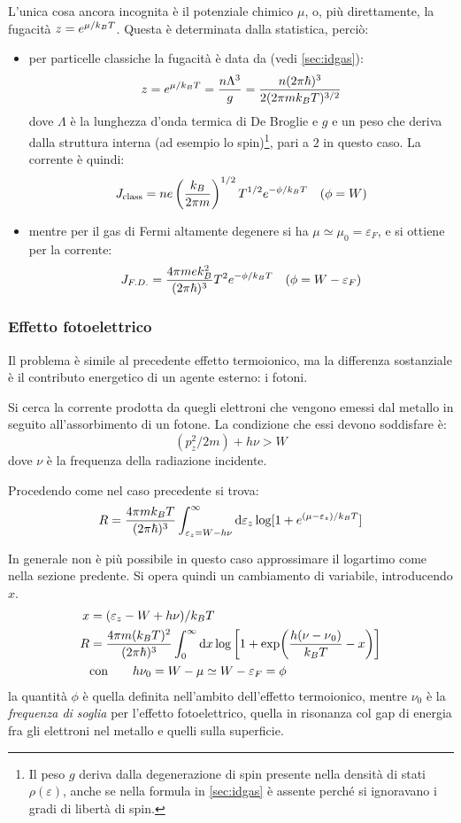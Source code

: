 L'unica cosa ancora incognita è il potenziale chimico $ \mu $, o, più direttamente, la fugacità $ z = e^{\mu/k_B T} $. Questa è determinata dalla statistica, perciò:
\begin{itemize}
	\item per particelle classiche la fugacità è data da (vedi \cref{sec:idgas}):
	\[ z = e^{\mu/k_B T} = \frac{n \Lambda^3}{g} = \frac{n (2\pi \hbar)^3}{2(2\pi m k_B T)^{3/2}} \]
	dove $ \Lambda $ è la lunghezza d'onda termica di De Broglie e $ g $ e un peso che deriva dalla struttura interna (ad esempio lo spin)\footnote{Il peso $ g $ deriva dalla degenerazione di spin presente nella densità di stati $ \rho(\varepsilon) $, anche se nella formula in \cref{sec:idgas} è assente perché si ignoravano i gradi di libertà di spin.}, pari a $ 2 $ in questo caso. La corrente è quindi:
	\[  J_{\text{class}} = ne \left(\frac{k_B}{2\pi m}\right)^{1/2} T^{1/2} e^{-\phi/k_B T} \quad (\phi = W)\]
	\item mentre 
	per il gas di Fermi altamente degenere si ha $ \mu \simeq \mu_0 = \varepsilon_F $, e si ottiene per la corrente:
	\[  J_{F.D.} =  \frac{4\pi m e k_B^2}{(2\pi \hbar)^3} T^2 e^{-\phi/k_B T} \quad (\phi = W - \varepsilon_F)\]
\end{itemize}

\subsubsection{Effetto fotoelettrico}

Il problema è simile al precedente effetto termoionico, ma la differenza sostanziale è il contributo energetico di un agente esterno: i fotoni.

Si cerca la corrente prodotta da quegli elettroni che vengono emessi dal metallo in seguito all'assorbimento di un fotone. La condizione che essi devono soddisfare è:
\[ (p_z^2 / 2m) + h \nu > W \] dove $ \nu $ è la frequenza della radiazione incidente.

Procedendo come nel caso precedente si trova:
\[ R = \frac{4\pi m k_B T}{(2\pi \hbar)^3} \int_{\varepsilon_z = W - h\nu}^{\infty} \dd \varepsilon_z \log[1 + e^{(\mu - \varepsilon_z)/k_B T}]  \]

In generale non è più possibile in questo caso approssimare il logartimo come nella sezione predente. Si opera quindi un cambiamento di variabile, introducendo $ x $.
\begin{align*}
x &= (\varepsilon_z - W + h\nu)/k_B T\\
R &= \frac{4\pi m (k_B T)^2}{(2\pi \hbar)^3} \int_{0}^{\infty} \dd x \log \left[1 + \exp(\frac{h(\nu - \nu{_0})}{k_B T} - x)\right] \\
&\text{con} \qquad h\nu_0 = W -\mu \simeq W - \varepsilon_F = \phi
\end{align*}
la quantità $ \phi $ è quella definita nell'ambito dell'effetto termoionico, mentre $ \nu_0 $ è la \textit{frequenza di soglia} per l'effetto fotoelettrico, quella in risonanza col gap di energia fra gli elettroni nel metallo e quelli sulla superficie.

